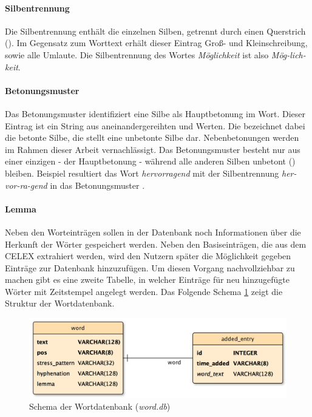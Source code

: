 \paragraph{Silbentrennung}
Die Silbentrennung enthält die einzelnen Silben, getrennt durch einen Querstrich (\qq{-}). Im Gegensatz zum Worttext erhält dieser Eintrag Groß- und Kleinschreibung, sowie alle Umlaute. Die Silbentrennung des Wortes \textit{Möglichkeit} ist also \textit{Mög-lich-keit}.

\paragraph{Betonungsmuster}
Das Betonungsmuster identifiziert eine Silbe als Hauptbetonung im Wort. Dieser Eintrag ist ein String aus aneinandergereihten  und  Werten. Die  bezeichnet dabei die betonte Silbe, die  stellt eine unbetonte Silbe dar. Nebenbetonungen werden im Rahmen dieser Arbeit vernachlässigt. Das Betonungsmuster besteht nur aus einer einzigen  - der Hauptbetonung - während alle anderen Silben unbetont () bleiben. Beispiel resultiert das Wort \textit{hervorragend} mit der Silbentrennung \textit{her-vor-ra-gend} in das Betonungsmuster .

\paragraph{Lemma}

Neben den Worteinträgen sollen in der Datenbank noch Informationen über die Herkunft der Wörter gespeichert werden. Neben den Basiseinträgen, die aus dem CELEX extrahiert werden, wird den Nutzern später die Möglichkeit gegeben Einträge zur Datenbank hinzuzufügen. Um diesen Vorgang nachvollziehbar zu machen gibt es eine zweite Tabelle, in welcher Einträge für neu hinzugefügte Wörter mit Zeitstempel angelegt werden. Das Folgende Schema \ref{fig:worddatabase} zeigt die Struktur der Wortdatenbank.

\begin{figure}[h!]
	\centering
	\includegraphics[width=.6\linewidth]{figures/worddb}
	\caption{Schema der Wortdatenbank (\textit{word.db})}
	\label{fig:worddatabase}
\end{figure}

